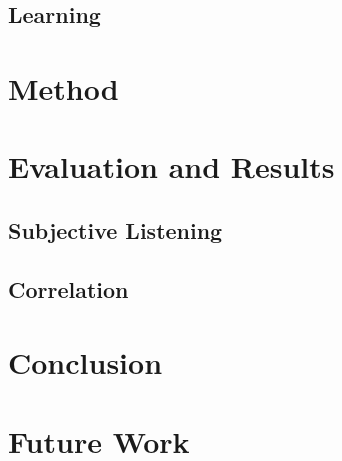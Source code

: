 \documentclass[a4paper,10pt]{article}
\begin{document}
\subsection{Learning}


\section{Method}
\section{Evaluation and Results}
\subsection{Subjective Listening}
\subsection{Correlation}
\section{Conclusion}
\section{Future Work}

  
 
 
\end{document}
